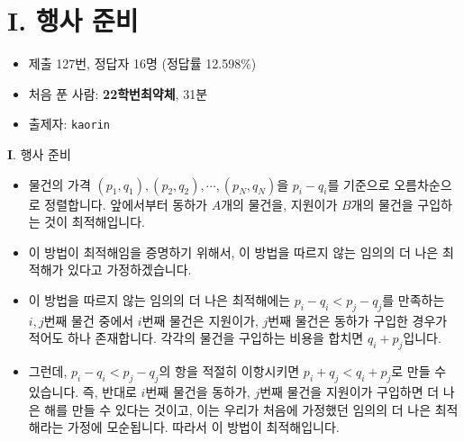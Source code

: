 \section{I. 행사 준비}

\begin{frame} %
    \begin{itemize}
        \item 제출 127번, 정답자 16명 (정답률 12.598\%)
        \item 처음 푼 사람: \textbf{22학번최약체}, 31분
        \item 출제자: \texttt{kaorin}
    \end{itemize}
\end{frame}

\begin{frame}{\textbf{I}. 행사 준비}
    \begin{itemize}
        \item 물건의 가격 $(p_1, q_1), (p_2, q_2), \cdots, (p_N, q_N)$을 $p_i - q_i$를 기준으로 오름차순으로 정렬합니다. 앞에서부터 동하가 $A$개의 물건을, 지원이가 $B$개의 물건을 구입하는 것이 최적해입니다.
        \item 이 방법이 최적해임을 증명하기 위해서, 이 방법을 따르지 않는 임의의 더 나은 최적해가 있다고 가정하겠습니다.
        \item 이 방법을 따르지 않는 임의의 더 나은 최적해에는 $p_i - q_i < p_j - q_j$를 만족하는 $i, j$번째 물건 중에서 $i$번째 물건은 지원이가, $j$번째 물건은 동하가 구입한 경우가 적어도 하나 존재합니다. 각각의 물건을 구입하는 비용을 합치면 $q_i + p_j$입니다.
        \item 그런데, $p_i - q_i < p_j - q_j$의 항을 적절히 이항시키면 $p_i + q_j < q_i + p_j$로 만들 수 있습니다. 즉, 반대로 $i$번째 물건을 동하가, $j$번째 물건을 지원이가 구입하면 더 나은 해를 만들 수 있다는 것이고, 이는 우리가 처음에 가정했던 임의의 더 나은 최적해라는 가정에 모순됩니다. 따라서 이 방법이 최적해입니다.
    \end{itemize}
\end{frame}